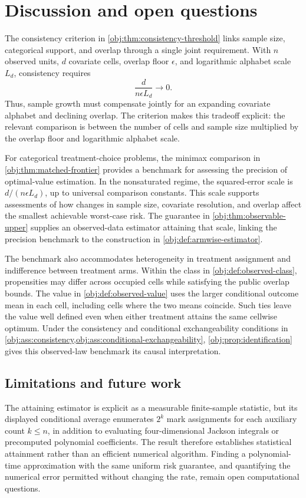 \section{Discussion and open questions}

The consistency criterion in \cref{obj:thm:consistency-threshold} links sample size, categorical support, and overlap through a single joint requirement. With \(n\) observed units, \(d\) covariate cells, overlap floor \(\epsilon\), and logarithmic alphabet scale \(L_d\), consistency requires
\[
\frac{d}{n\epsilon L_d}\longrightarrow 0.
\]
Thus, sample growth must compensate jointly for an expanding covariate alphabet and declining overlap. The criterion makes this tradeoff explicit: the relevant comparison is between the number of cells and sample size multiplied by the overlap floor and logarithmic alphabet scale.

For categorical treatment-choice problems, the minimax comparison in \cref{obj:thm:matched-frontier} provides a benchmark for assessing the precision of optimal-value estimation. In the nonsaturated regime, the squared-error scale is \(d/(n\epsilon L_d)\), up to universal comparison constants. This scale supports assessments of how changes in sample size, covariate resolution, and overlap affect the smallest achievable worst-case risk. The guarantee in \cref{obj:thm:observable-upper} supplies an observed-data estimator attaining that scale, linking the precision benchmark to the construction in \cref{obj:def:armwise-estimator}.

The benchmark also accommodates heterogeneity in treatment assignment and indifference between treatment arms. Within the class in \cref{obj:def:observed-class}, propensities may differ across occupied cells while satisfying the public overlap bounds. The value in \cref{obj:def:observed-value} uses the larger conditional outcome mean in each cell, including cells where the two means coincide. Such ties leave the value well defined even when either treatment attains the same cellwise optimum. Under the consistency and conditional exchangeability conditions in \cref{obj:ass:consistency,obj:ass:conditional-exchangeability}, \cref{obj:prop:identification} gives this observed-law benchmark its causal interpretation.

\subsection{Limitations and future work}

The attaining estimator is explicit as a measurable finite-sample statistic, but its displayed conditional average enumerates \(2^k\) mark assignments for each auxiliary count \(k\le n\), in addition to evaluating four-dimensional Jackson integrals or precomputed polynomial coefficients. The result therefore establishes statistical attainment rather than an efficient numerical algorithm. Finding a polynomial-time approximation with the same uniform risk guarantee, and quantifying the numerical error permitted without changing the rate, remain open computational questions.

